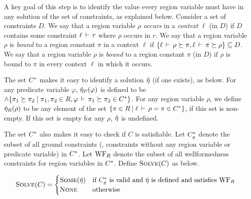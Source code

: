 A key goal of this step is to identify the value every region variable must
have in any solution of the set of constraints, as explained below.
%
%
Consider a set of constraints $D$. We say that a region variable $\rho$
\emph{occurs} in a \emph{context} $\ell$ (in $D$) if $D$ contains some
constraint $\ell\,\vdash\,r$ where $\rho$ occurs in $r$.
We say that a region variable $\rho$ is \emph{bound} to a region constant
$\pi$ in a context $\ell$ if
$\{ \ell\,\vdash\,\rho \succeq \pi, \ell\,\vdash\,\pi \succeq \rho \} \subseteq D$.
We say that a region variable $\rho$ is \emph{bound} to a region constant $\pi$ (in $D$) if
$\rho$ is bound to $\pi$ in every context $\ell$ in which it occurs.


The set ${C}^*$ makes it easy to identify a solution $\hat{\eta}$ (if one exists), as below.
For any predicate variable $\varphi$, $\hat{\eta}_P(\varphi)$ is defined
to be $\wedge \{ \pi_1 \succeq \pi_2 \;|\; \pi_1, \pi_2 \in R, \varphi\,\vdash\,\pi_1 \succeq \pi_2 \in {C}^* \}$.
For any region variable $\rho$, we define $\hat{\eta}_R(\rho)$ to be any element of the
set $\{ \pi \in R \:|\; \ell\,\vdash\,\rho = \pi \in {C}^* \}$,
if this set is non-empty. If this set is empty for any $\rho$, $\hat{\eta}$ is undefined.

The set ${C}^*$ also makes it easy to check if $C$ is satisfiable.
Let ${C}^*_g$ denote the subset of all ground constraints
(\ie, constraints without any region variable or predicate variable)
in ${C}^*$. Let $\text{WF}_R$ denote the subset of all wellformedness
constraints for region variables in ${C}^*$.
Define $\textsc{Solve}(C)$ as below.

\[
\textsc{Solve}(C) = 
\begin{cases}
\textsc{Some} (\hat{\eta}) & \textrm{if ${C}^*_g$ is valid and $\hat{\eta}$ is defined and satisfies $\text{WF}_R$} \\
\textsc{None} & \textrm{otherwise}
\end{cases}
\]


